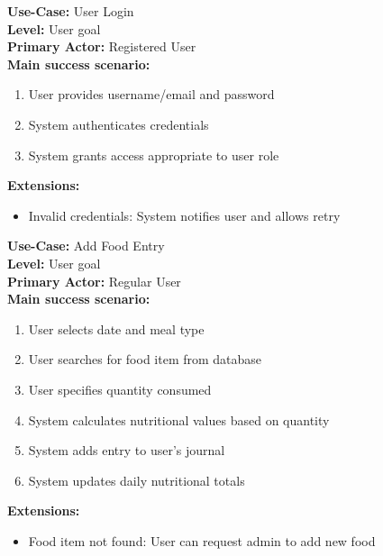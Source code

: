 \documentclass[a4paper,10pt]{article}
\begin{document}
        \textbf{Use-Case:} User Login\\
        \textbf{Level:} User goal\\
        \textbf{Primary Actor:} Registered User\\
        \textbf{Main success scenario:}
        \begin{enumerate}
            \item User provides username/email and password
            \item System authenticates credentials
            \item System grants access appropriate to user role
        \end{enumerate}
        \textbf{Extensions:}
        \begin{itemize}
            \item Invalid credentials: System notifies user and allows retry
        \end{itemize}

        \textbf{Use-Case:} Add Food Entry\\
        \textbf{Level:} User goal\\
        \textbf{Primary Actor:} Regular User\\
        \textbf{Main success scenario:}
        \begin{enumerate}
            \item User selects date and meal type
            \item User searches for food item from database
            \item User specifies quantity consumed
            \item System calculates nutritional values based on quantity
            \item System adds entry to user's journal
            \item System updates daily nutritional totals
        \end{enumerate}
        \textbf{Extensions:}
        \begin{itemize}
            \item Food item not found: User can request admin to add new food
        \end{itemize}
\end{document}
